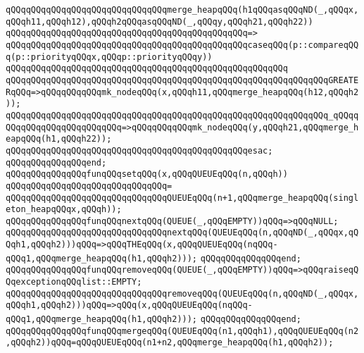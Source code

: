 \verb|qQQqqQQqqQQqqQQqqQQqqQQqqQQqqQQqmerge_heapqQQq(h1qQQqasqQQqND(_,qQQqx,qQQqh11,qQQqh12),qQQqh2qQQqasqQQqND(_,qQQqy,qQQqh21,qQQqh22))|\newline
\verb|qQQqqQQqqQQqqQQqqQQqqQQqqQQqqQQqqQQqqQQqqQQqqQQq=>|\newline
\verb|qQQqqQQqqQQqqQQqqQQqqQQqqQQqqQQqqQQqqQQqqQQqqQQqcaseqQQq(p::compareqQQq(p::priorityqQQqx,qQQqp::priorityqQQqy))|\newline
\verb|qQQqqQQqqQQqqQQqqQQqqQQqqQQqqQQqqQQqqQQqqQQqqQQqqQQqqQQq|\newline
\verb|qQQqqQQqqQQqqQQqqQQqqQQqqQQqqQQqqQQqqQQqqQQqqQQqqQQqqQQqqQQqqQQqGREATERqQQq=>qQQqqQQqqQQqmk_nodeqQQq(x,qQQqh11,qQQqmerge_heapqQQq(h12,qQQqh2));|\newline
\verb|qQQqqQQqqQQqqQQqqQQqqQQqqQQqqQQqqQQqqQQqqQQqqQQqqQQqqQQqqQQqqQQq_qQQqqQQqqQQqqQQqqQQqqQQqqQQq=>qQQqqQQqqQQqmk_nodeqQQq(y,qQQqh21,qQQqmerge_heapqQQq(h1,qQQqh22));|\newline
\verb|qQQqqQQqqQQqqQQqqQQqqQQqqQQqqQQqqQQqqQQqqQQqqQQqesac;|\newline
\verb|qQQqqQQqqQQqqQQqend;|\newline
\newline
\verb|qQQqqQQqqQQqqQQqfunqQQqsetqQQq(x,qQQqQUEUEqQQq(n,qQQqh))|\newline
\verb|qQQqqQQqqQQqqQQqqQQqqQQqqQQqqQQq=|\newline
\verb|qQQqqQQqqQQqqQQqqQQqqQQqqQQqqQQqQUEUEqQQq(n+1,qQQqmerge_heapqQQq(singleton_heapqQQqx,qQQqh));|\newline
\newline
\verb|qQQqqQQqqQQqqQQqfunqQQqnextqQQq(QUEUE(_,qQQqEMPTY))qQQq=>qQQqNULL;|\newline
\verb|qQQqqQQqqQQqqQQqqQQqqQQqqQQqqQQqnextqQQq(QUEUEqQQq(n,qQQqND(_,qQQqx,qQQqh1,qQQqh2)))qQQq=>qQQqTHEqQQq(x,qQQqQUEUEqQQq(nqQQq-qQQq1,qQQqmerge_heapqQQq(h1,qQQqh2)));|\newline
\verb|qQQqqQQqqQQqqQQqend;|\newline
\newline
\verb|qQQqqQQqqQQqqQQqfunqQQqremoveqQQq(QUEUE(_,qQQqEMPTY))qQQq=>qQQqraiseqQQqexceptionqQQqlist::EMPTY;|\newline
\verb|qQQqqQQqqQQqqQQqqQQqqQQqqQQqqQQqremoveqQQq(QUEUEqQQq(n,qQQqND(_,qQQqx,qQQqh1,qQQqh2)))qQQq=>qQQq(x,qQQqQUEUEqQQq(nqQQq-qQQq1,qQQqmerge_heapqQQq(h1,qQQqh2)));|\newline
\verb|qQQqqQQqqQQqqQQqend;|\newline
\newline
\verb|qQQqqQQqqQQqqQQqfunqQQqmergeqQQq(QUEUEqQQq(n1,qQQqh1),qQQqQUEUEqQQq(n2,qQQqh2))qQQq=qQQqQUEUEqQQq(n1+n2,qQQqmerge_heapqQQq(h1,qQQqh2));|\newline
